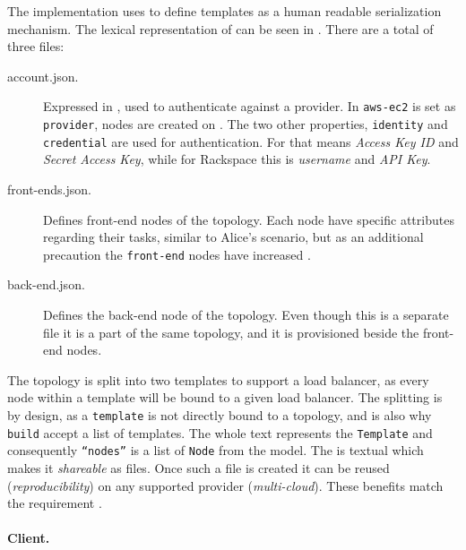 The implementation uses  to define templates as a human readable serialization mechanism.
The lexical representation of  can be seen in .
There are a total of three files:
\begin{description}
  \item[account.json.]
    Expressed in , used to authenticate against a provider.
    In  \texttt{aws-ec2} is set as \texttt{provider},
    \ie nodes are created on .
    The two other properties, \texttt{identity} and \texttt{credential} are used for authentication.
    For  that means \emph{Access Key ID} and \emph{Secret Access Key},
    while for Rackspace this is \emph{username} and \emph{API Key}.
  \item[front-ends.json.]
    Defines front-end nodes of the topology.
    Each node have specific attributes regarding their tasks, similar to Alice's scenario,
    but as an additional precaution the \texttt{front-end} nodes have increased .
  \item[back-end.json.]
    Defines the back-end node of the topology.
    Even though this is a separate file it is a part of the same topology,
    and it is provisioned beside the front-end nodes.
\end{description}
The topology is split into two templates to support a load balancer,
as every node within a template will be bound to a given load balancer.
The splitting is by design, as a \texttt{template} is not directly bound to a topology,
and is also why \texttt{build} accept a list of templates.
The whole text represents the \texttt{Template} and consequently 
\texttt{``nodes''} is a list of \texttt{Node} from the model.
The  is textual which makes it \emph{shareable} as files.
Once such a file is created it can be reused (\emph{reproducibility}) 
on any supported provider (\emph{multi-cloud}).
These benefits match the requirement .

\paragraph{Client.}


